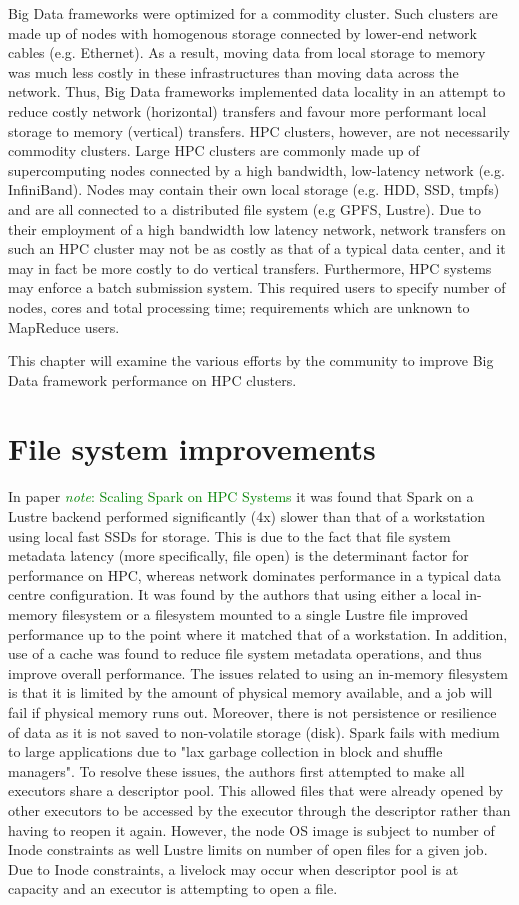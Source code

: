 \documentclass{report}
\newcommand{\note}[1]{\textcolor{green}{\textit{note}: #1}}
\begin{document}
	Big Data frameworks were optimized for a commodity cluster.  Such clusters are made up of nodes with homogenous storage connected by lower-end network cables (e.g. Ethernet). As a result, moving data from local storage to memory was much less costly in these infrastructures than moving data across the network. Thus, Big Data frameworks implemented data locality in an attempt to reduce costly network (horizontal) transfers and favour more performant local storage to memory (vertical) transfers. HPC clusters, however, are not necessarily commodity clusters. Large HPC clusters are commonly made up of supercomputing nodes connected by a high bandwidth, low-latency network (e.g. InfiniBand). Nodes may contain their own local storage (e.g. HDD, SSD, tmpfs) and are all connected to a distributed file system (e.g GPFS, Lustre).  Due to their employment of a high bandwidth low latency network, network transfers on such an HPC cluster may not be as costly as that of a typical data center, and it may in fact be more costly to do vertical transfers. Furthermore, HPC systems may enforce a batch submission system. This required users to specify number of nodes, cores and total processing time; requirements which are unknown to MapReduce users.
	
	This chapter will examine the various efforts by the community to improve Big Data framework performance on HPC clusters.
	
	\section{File system improvements}
	
	In paper \note{Scaling Spark on HPC Systems} it was found that Spark on a Lustre backend performed significantly (4x) slower than that of a workstation using local fast SSDs for storage. This is due to the fact that file system metadata latency (more specifically, file open) is the determinant factor for performance on HPC, whereas network dominates performance in a typical data centre configuration. It was found by the authors that using either a local in-memory filesystem or a filesystem mounted to a single Lustre file improved performance up to the point where it matched that of a workstation. In addition, use of a cache was found to reduce file system metadata operations, and thus improve overall performance. 
	The issues related to using an in-memory filesystem is that it is limited by the amount of physical memory available, and a job will fail if physical memory runs out. Moreover, there is not persistence or resilience of data as it is not saved to non-volatile storage (disk). Spark fails with medium to large applications due to "lax garbage collection in block and shuffle managers". To resolve these issues, the authors first attempted to make all executors share a descriptor pool. This allowed files that were already opened by other executors to be accessed by the executor through the descriptor rather than having to reopen it again. However, the node OS image is subject to number of Inode constraints as well Lustre limits on number of open files for a given job. Due to Inode constraints, a livelock may occur when descriptor pool is at capacity and an executor is attempting to open a file.
	
\end{document}
